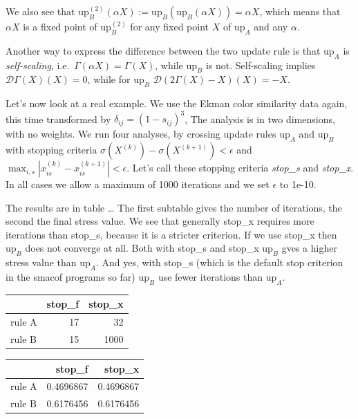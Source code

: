 \documentclass[
  12pt,
  letterpaper,
  DIV=11,
  numbers=noendperiod]{scrreprt}
\theoremstyle{remark}
\begin{document}
We also see that
\(\text{up}^{(2)}_B(\alpha X):=\text{up}_B(\text{up}_B(\alpha X))=\alpha X\),
which means that \(\alpha X\) is a fixed point of \(\text{up}_B^{(2)}\)
for any fixed point \(X\) of \(\text{up}_A\) and any \(\alpha\).

Another way to express the difference between the two update rule is
that \(\text{up}_A\) is \emph{self-scaling},
i.e.~\(\Gamma(\alpha X)=\Gamma(X)\), while \(\text{up}_B\) is not.
Self-scaling implies \(\mathcal{D}\Gamma(X)(X)=0\), while for
\(\text{up}_B\) \(\mathcal{D}(2\Gamma(X)-X)(X)=-X\).

Let's now look at a real example. We use the Ekman color similarity data
again, this time transformed by \(\delta_{ij}=(1-s_{ij})^3\), The
analysis is in two dimensions, with no weights. We run four analyses, by
crossing update rules \(\text{up}_A\) and \(\text{up}_B\) with stopping
criteria \(\sigma(X^{(k)})-\sigma(X^{(k+1)})<\epsilon\) and
\(\max_{i,s}|x^{(k)}_{is}-x^{(k+1)}_{is}|<\epsilon\). Let's call these
stopping criteria \emph{stop\_s} and \emph{stop\_x}. In all cases we
allow a maximum of 1000 iterations and we set \(\epsilon\) to 1e-10.

The results are in table \ldots{} The first subtable gives the number of
iterations, the second the final stress value. We see that generally
stop\_x requires more iterations than stop\_s, because it is a stricter
criterion. If we use stop\_x then \(\text{up}_B\) does not converge at
all. Both with stop\_s and stop\_x \(\text{up}_B\) gves a higher stress
value than \(\text{up}_A\). And yes, with stop\_s (which is the default
stop criterion in the smacof programs so far) \(\text{up}_B\) use fewer
iterations than \(\text{up}_A\).

\begin{table}

\centering
\begin{tabular}[t]{l|r|r}
\hline
  & stop\_f & stop\_x\\
\hline
rule A & 17 & 32\\
\hline
rule B & 15 & 1000\\
\hline
\end{tabular}
\centering
\begin{tabular}[t]{l|r|r}
\hline
  & stop\_f & stop\_x\\
\hline
rule A & 0.4696867 & 0.4696867\\
\hline
rule B & 0.6176456 & 0.6176456\\
\hline
\end{tabular}
\end{table}
\end{document}
